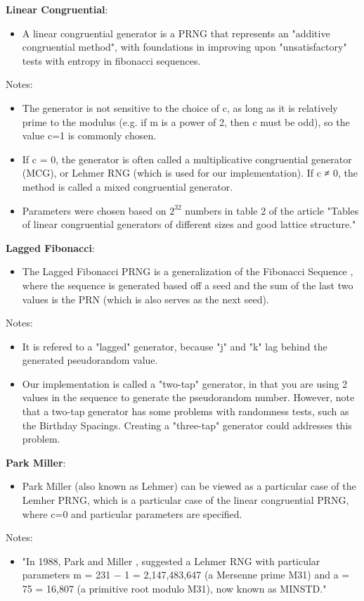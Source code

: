 \documentclass[conference]{IEEEtran}
\begin{document}
\noindent\textbf{Linear Congruential}:
\begin{itemize}
    \item A linear congruential generator is a PRNG that represents an "additive  congruential  method", with foundations in improving upon "unsatisfactory" tests with entropy in fibonacci sequences. \cite{10.1145/321008.321019}
\end{itemize}
Notes:
\begin{itemize}
    \item The generator is not sensitive to the choice of c, 
as long as it is relatively prime to the modulus 
(e.g. if m is a power of 2, then c must be odd), 
so the value c=1 is commonly chosen.
    \item If c = 0, the generator is often called a multiplicative
congruential generator (MCG), or Lehmer RNG (which is used for our implementation). If c ≠ 0, the
method is called a mixed congruential generator.
    \item Parameters were chosen based on $2^32$ numbers in table 2 of the article "Tables of linear congruential generators of different sizes and good lattice structure." \cite{LEcuyer1999TablesOL}
\end{itemize}


\noindent\textbf{Lagged Fibonacci}:
\begin{itemize}
    \item The Lagged Fibonacci PRNG is a generalization of the Fibonacci Sequence \cite{lucas1891calcul}, where the sequence is generated based off a seed and the sum of the last two values is the PRN (which is also serves as the next seed).
\end{itemize}
Notes:
\begin{itemize}
    \item It is refered to a "lagged" generator, because "j" and "k" lag behind the generated pseudorandom value. 
    \item Our implementation is called a "two-tap" generator, in that you are using 2 values in the sequence 
to generate the pseudorandom number. However, note that a two-tap generator has some problems with 
randomness tests, such as the Birthday Spacings. Creating a "three-tap" generator could
addresses this problem.
\end{itemize}


\noindent\textbf{Park Miller}:
\begin{itemize}
    \item Park Miller (also known as Lehmer) can be viewed as a particular case of the Lemher PRNG, which is a particular case of the linear congruential PRNG, where c=0 and particular parameters are specified.
\end{itemize}
Notes:
\begin{itemize}
    \item "In 1988, Park and Miller \cite{10.1145/63039.63042}, suggested a Lehmer RNG with particular parameters m = 231 − 1 = 2,147,483,647 (a Mersenne prime M31) and a = 75 = 16,807 (a primitive root modulo M31), now known as MINSTD." \cite{ParkMiller}
\end{itemize}
\end{document}
